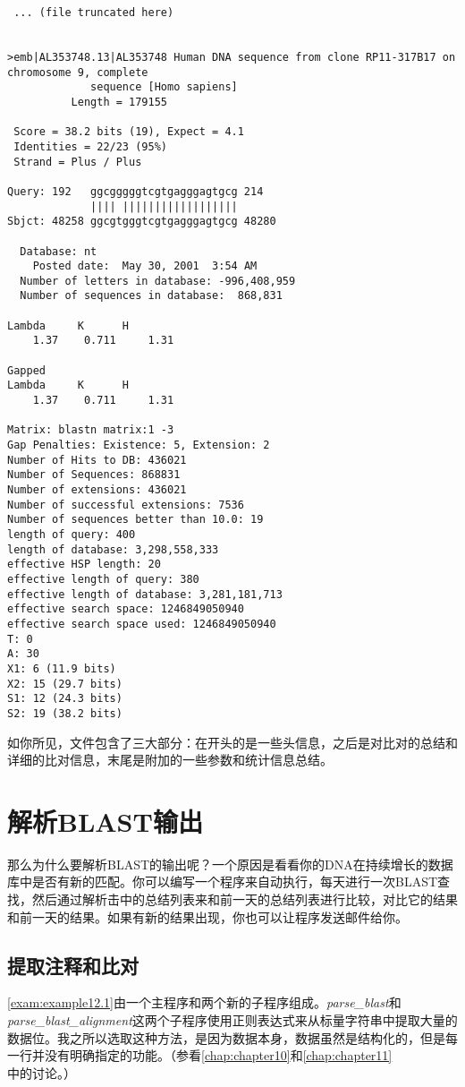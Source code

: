 \begin{lstlisting}
 ... (file truncated here)


>emb|AL353748.13|AL353748 Human DNA sequence from clone RP11-317B17 on
chromosome 9, complete
             sequence [Homo sapiens]
          Length = 179155

 Score = 38.2 bits (19), Expect = 4.1
 Identities = 22/23 (95%)
 Strand = Plus / Plus

Query: 192   ggcgggggtcgtgagggagtgcg 214
             |||| ||||||||||||||||||
Sbjct: 48258 ggcgtgggtcgtgagggagtgcg 48280

  Database: nt
    Posted date:  May 30, 2001  3:54 AM
  Number of letters in database: -996,408,959
  Number of sequences in database:  868,831

Lambda     K      H
    1.37    0.711     1.31

Gapped
Lambda     K      H
    1.37    0.711     1.31

Matrix: blastn matrix:1 -3
Gap Penalties: Existence: 5, Extension: 2
Number of Hits to DB: 436021
Number of Sequences: 868831
Number of extensions: 436021
Number of successful extensions: 7536
Number of sequences better than 10.0: 19
length of query: 400
length of database: 3,298,558,333
effective HSP length: 20
effective length of query: 380
effective length of database: 3,281,181,713
effective search space: 1246849050940
effective search space used: 1246849050940
T: 0
A: 30
X1: 6 (11.9 bits)
X2: 15 (29.7 bits)
S1: 12 (24.3 bits)
S2: 19 (38.2 bits)
\end{lstlisting}

如你所见，文件包含了三大部分：在开头的是一些头信息，之后是对比对的总结和详细的比对信息，末尾是附加的一些参数和统计信息总结。

\section{解析BLAST输出}
那么为什么要解析BLAST的输出呢？一个原因是看看你的DNA在持续增长的数据库中是否有新的匹配。你可以编写一个程序来自动执行，每天进行一次BLAST查找，然后通过解析击中的总结列表来和前一天的总结列表进行比较，对比它的结果和前一天的结果。如果有新的结果出现，你也可以让程序发送邮件给你。

\subsection{提取注释和比对}
\autoref{exam:example12.1}由一个主程序和两个新的子程序组成。\textit{parse\_blast}和\textit{parse\_blast\_alignment}这两个子程序使用正则表达式来从标量字符串中提取大量的数据位。我之所以选取这种方法，是因为数据本身，数据虽然是结构化的，但是每一行并没有明确指定的功能。（参看\autoref{chap:chapter10}和\autoref{chap:chapter11}中的讨论。）

